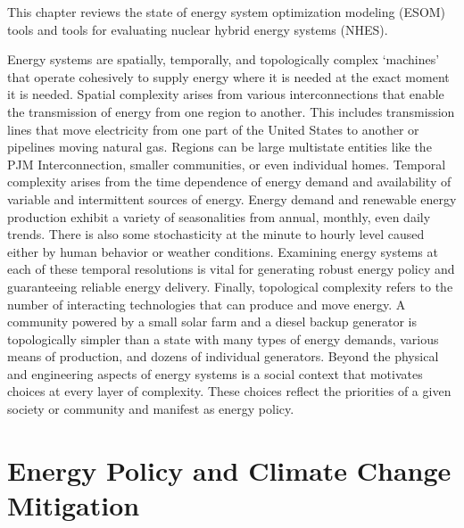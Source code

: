 This chapter reviews the state of energy system optimization modeling (ESOM) tools
and tools for evaluating nuclear hybrid energy systems (NHES).

Energy systems are spatially, temporally, and topologically complex ‘machines’
that operate cohesively to supply energy where it is needed at the exact moment
it is needed. Spatial complexity arises from various interconnections that enable
the transmission of energy from one region to another. This includes transmission
lines that move electricity from one part of the United States to another or
pipelines moving natural gas. Regions can be large multistate entities like the
PJM Interconnection, smaller communities, or even individual homes. Temporal
complexity arises from the time dependence of energy demand and availability of
variable and intermittent sources of energy. Energy demand and renewable energy
production
exhibit a variety of seasonalities from annual, monthly, even daily trends.
There is also some stochasticity at the minute to hourly level caused either by
human behavior or weather conditions.
Examining energy systems at each of these temporal resolutions is vital for
generating robust energy policy and guaranteeing reliable energy delivery. Finally,
topological complexity refers to the number of interacting technologies that can
produce and move energy. A community powered by a small solar farm and a diesel
backup generator is topologically simpler than a state with many types of energy
demands, various means of production, and dozens of individual generators. Beyond
the physical and engineering aspects of energy systems is a social context that
motivates choices at every layer of complexity. These choices reflect the priorities
of a given society or community and manifest as energy policy.

\section{Energy Policy and Climate Change Mitigation}


